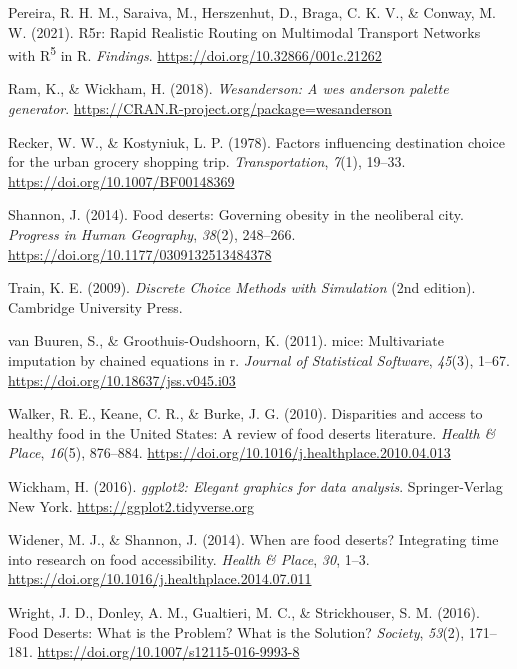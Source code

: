 \documentclass[
  letterpaper,
  number,
  review,
  3p]{elsarticle}
\newlength{\cslhangindent}
\newenvironment{CSLReferences}[2] %
 {\begin{list}{}{%
  \setlength{\itemindent}{0pt}
  \setlength{\leftmargin}{0pt}
  \setlength{\parsep}{0pt}
  \ifodd #1
   \setlength{\leftmargin}{\cslhangindent}
   \setlength{\itemindent}{-1\cslhangindent}
  \fi
  \setlength{\itemsep}{#2\baselineskip}}}
 {\end{list}}
\begin{document}
\begin{CSLReferences}{1}{0}
Pereira, R. H. M., Saraiva, M., Herszenhut, D., Braga, C. K. V., \&
Conway, M. W. (2021). R5r: {Rapid Realistic Routing} on {Multimodal
Transport Networks} with {R}{\textsuperscript{5}} in {R}.
\emph{Findings}. \url{https://doi.org/10.32866/001c.21262}

Ram, K., \& Wickham, H. (2018). \emph{Wesanderson: A wes anderson
palette generator}. \url{https://CRAN.R-project.org/package=wesanderson}

Recker, W. W., \& Kostyniuk, L. P. (1978). Factors influencing
destination choice for the urban grocery shopping trip.
\emph{Transportation}, \emph{7}(1), 19--33.
\url{https://doi.org/10.1007/BF00148369}

Shannon, J. (2014). Food deserts: {Governing} obesity in the neoliberal
city. \emph{Progress in Human Geography}, \emph{38}(2), 248--266.
\url{https://doi.org/10.1177/0309132513484378}

Train, K. E. (2009). \emph{Discrete {Choice Methods} with {Simulation}}
(2nd edition). Cambridge University Press.

van Buuren, S., \& Groothuis-Oudshoorn, K. (2011). {mice}: Multivariate
imputation by chained equations in r. \emph{Journal of Statistical
Software}, \emph{45}(3), 1--67.
\url{https://doi.org/10.18637/jss.v045.i03}

Walker, R. E., Keane, C. R., \& Burke, J. G. (2010). Disparities and
access to healthy food in the {United States}: {A} review of food
deserts literature. \emph{Health \& Place}, \emph{16}(5), 876--884.
\url{https://doi.org/10.1016/j.healthplace.2010.04.013}

Wickham, H. (2016). \emph{ggplot2: Elegant graphics for data analysis}.
Springer-Verlag New York. \url{https://ggplot2.tidyverse.org}

Widener, M. J., \& Shannon, J. (2014). When are food deserts?
{Integrating} time into research on food accessibility. \emph{Health \&
Place}, \emph{30}, 1--3.
\url{https://doi.org/10.1016/j.healthplace.2014.07.011}

Wright, J. D., Donley, A. M., Gualtieri, M. C., \& Strickhouser, S. M.
(2016). Food {Deserts}: {What} is the {Problem}? {What} is the
{Solution}? \emph{Society}, \emph{53}(2), 171--181.
\url{https://doi.org/10.1007/s12115-016-9993-8}

\end{CSLReferences}
\end{document}
